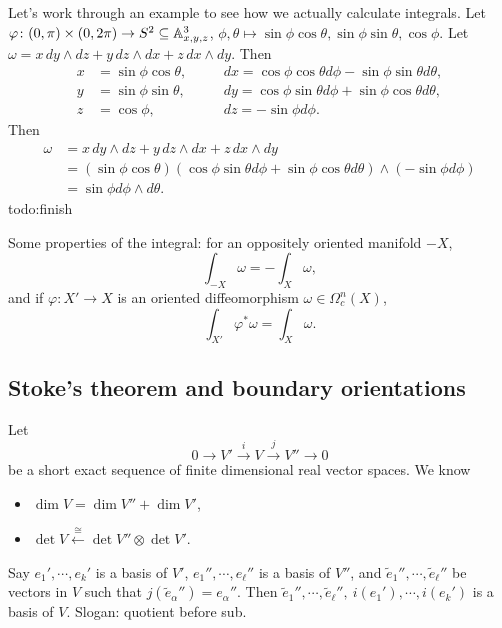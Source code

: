 \begin{example}
    Let's work through an example to see how we actually calculate integrals. Let $\varphi  \colon (0,\pi) \times (0, 2\pi) \to S^2 \subseteq \mathbb{A}^3_{x,y,z}$, $\phi,\theta \mapsto  \sin \phi  \cos \theta, \sin \phi \sin \theta, \cos \phi$. Let $\omega = x\,dy\wedge dz +y \, dz\wedge dx+z\, dx\wedge dy$. Then 
    \begin{align*}
        x&= \sin \phi  \cos \theta,\quad &&dx= \cos \phi \cos \theta d \phi - \sin \phi \sin \theta d \theta,\\
        y&=\sin \phi \sin \theta, &&dy=\cos \phi \sin \theta d \phi+ \sin \phi \cos \theta d \theta,\\
        z&=\cos \phi,&&dz=- \sin \phi d \phi.
    \end{align*}Then
    \begin{align*}
        \omega &=x \,dy\wedge dz+y\,dz\wedge dx+z\,dx\wedge dy\\
               &=(\sin \phi \cos \theta)(\cos \phi \sin \theta d\phi+ \sin \phi\cos \theta d \theta)\wedge (-\sin \phi d \phi)\\
               &=\sin \phi d \phi\wedge d\theta.
    \end{align*}
    {\color{red}todo:finish} 
\end{example}

Some properties of the integral: for an oppositely oriented manifold $-X$, \[
\int_{-X}\omega =- \int _X\omega,
\]and if $\varphi \colon X' \to X$ is an oriented diffeomorphism $\omega \in \Omega_c^n (X)$, \[
\int _{X'}\varphi ^*\omega= \int_X\omega.
\] 
\subsection{Stoke's theorem and boundary orientations}
Let \[
0 \to V' \overset{i}{\to } V \overset{j}{\to } V'' \to 0
\] be a short exact sequence of finite dimensional real vector spaces. We know 
\begin{itemize}
    \item $\dim V=\dim V''+\dim V'$,
    \item $\det V \overset{\cong}{\leftarrow} \det V''\otimes \det V'$.
\end{itemize}
Say $e_1',\cdots ,e_k'$ is a basis of $V'$, $e_1'',\cdots ,e_{\ell}''$ is a basis of $V''$, and ${ \widetilde e_1}'',\cdots ,{\widetilde e_{\ell}}'' $ be vectors in $V$ such that $j({\widetilde e_{\alpha }} '')=e_{\alpha }''$. Then ${\widetilde e_1} '',\cdots ,{\widetilde e_{\ell}} '', \ i(e_1'),\cdots ,i(e_k')$ is a basis of $V$. Slogan: quotient before sub.


